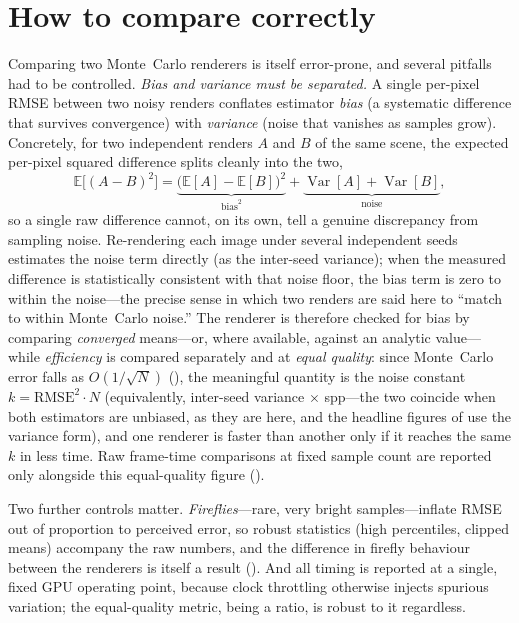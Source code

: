 \section{How to compare correctly}
\label{sec:compare-correctly}

Comparing two Monte~Carlo renderers is itself error-prone, and several pitfalls had to be controlled.
\emph{Bias and variance must be separated.} A single per-pixel RMSE between two noisy renders conflates
estimator \emph{bias} (a systematic difference that survives convergence) with \emph{variance} (noise
that vanishes as samples grow). Concretely, for two independent renders $A$ and $B$ of the same scene,
the expected per-pixel squared difference splits cleanly into the two,
\[
  \mathbb{E}\big[(A-B)^2\big]
  = \underbrace{\big(\mathbb{E}[A]-\mathbb{E}[B]\big)^2}_{\text{bias}^2}
  + \underbrace{\operatorname{Var}[A]+\operatorname{Var}[B]}_{\text{noise}},
\]
so a single raw difference cannot, on its own, tell a genuine discrepancy from sampling noise.
Re-rendering each image under several independent seeds estimates the noise term directly (as the
inter-seed variance); when the measured difference is statistically consistent with that noise floor,
the bias term is zero to within the noise---the precise sense in which two renders are said here to
``match to within Monte~Carlo noise.'' The renderer is therefore checked for bias by comparing
\emph{converged} means---or, where available, against an analytic value---while \emph{efficiency} is
compared separately and at \emph{equal quality}: since Monte~Carlo error falls as
$O(1/\sqrt{N})$ (), the meaningful quantity is the noise constant
$k = \mathrm{RMSE}^2 \cdot N$ (equivalently, inter-seed variance $\times$ spp---the two coincide when
both estimators are unbiased, as they are here, and the headline figures of  use the
variance form), and one renderer is faster than another only if it reaches the same $k$ in less time. Raw frame-time comparisons at fixed sample count are reported only alongside this
equal-quality figure ().

Two further controls matter. \emph{Fireflies}---rare, very bright samples---inflate RMSE out of
proportion to perceived error, so robust statistics (high percentiles, clipped means) accompany the raw
numbers, and the difference in firefly behaviour between the renderers is itself a result
(). And all timing is reported at a single, fixed GPU operating point, because clock
throttling otherwise injects spurious variation; the equal-quality metric, being a ratio, is robust to
it regardless.

